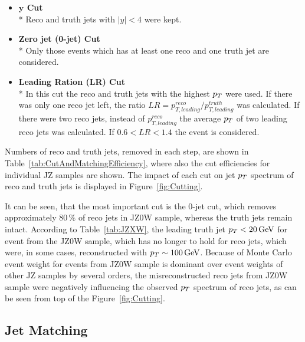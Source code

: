 \begin{itemize}

  \item \textbf{$\mathbf{y}$ Cut}
  \\*
    Reco and truth jets with $|y| < 4$ were kept.

  \item \textbf{Zero jet (0-jet) Cut}
  \\*
    Only those events which has at least one reco and one truth jet are
    considered.
    
  \item \textbf{Leading Ration (LR) Cut}
  \\*
    In this cut the reco and truth jets with the highest $p_{T}$ were used. If
    there was only one reco jet left, the ratio $LR = p_{T,leading}^{reco} /
    p_{T,leading}^{truth}$ was calculated. If there were two reco jets, instead
    of $p_{T,leading}^{reco}$ the average $p_{T}$ of two leading reco jets was
    calculated. If $0.6 < LR < 1.4$ the event is considered.

\end{itemize}

Numbers of reco and truth jets, removed in each step, are shown in
Table~\ref{tab:CutAndMatchingEfficiency}, where also the cut efficiencies for
individual JZ samples are shown. The impact of each cut on jet $p_{T}$ spectrum
of reco and truth jets is displayed in Figure~\ref{fig:Cutting}. 

It can be seen, that the most important cut is the 0-jet cut, which removes
approximately $80\,\%$ of reco jets in JZ0W sample, whereas the truth jets
remain intact. According to Table~\ref{tab:JZXW}, the leading truth jet $p_{T} <
20 \,\text{GeV}$ for event from the JZ0W sample, which has no longer to hold for reco
jets, which were, in some cases, reconstructed with $p_{T} \sim 100 \,\text{GeV}$. Because
of Monte Carlo event weight for events from JZ0W sample is dominant over event
weights of other JZ samples by several orders, the misreconstructed reco jets
from JZ0W sample were negatively influencing the observed $p_{T}$ spectrum of reco
jets, as can be seen from top of the Figure~\ref{fig:Cutting}.

\subsection{Jet Matching}
\label{SubSec:JetMatching}

